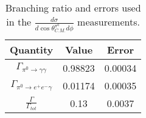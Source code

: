 \begin{table}[h!]
\begin{center}


\caption[Branching Ratios of \piz]{\label{tab:brspecs}Branching ratio and errors used in the $\frac{d\sigma}{d\cos\theta^{\pi^0}_{C.M.} d\phi}$ measurements. \vspace{0.75mm}}

\begin{tabular}{c|c|c}

\hline
Quantity & Value & Error \\
\hline
$\Gamma_{\pi^{0}\rightarrow \gamma \gamma }$& 0.98823 & 0.00034 \\
$\Gamma_{\pi^{0}\rightarrow e^{+}e^{-}\gamma}$ & 0.01174 & 0.00035 \\
$\frac{\Gamma}{\Gamma_{tot}}$ & 0.13 & 0.0037 \\
\hline \hline
\end{tabular}


\end{center}
\end{table}
